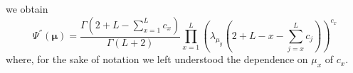 \documentclass[10pt]{article}
\numberwithin{equation}{section}
\numberwithin{equation}{subsection}
\begin{document}
we obtain 
\begin{equation}\label{coefficients-psiSec}
	\Psi^{''}(\bm{\mu})=\frac{\Gamma(2+L-\sum_{x=1}^{L}c_{x})}{\Gamma(L+2)}\prod_{x=1}^{L}\left(\lambda_{\mu_{y}}\left(2+L-x-\sum_{j=x}^{L}c_{j}\right)\right)^{c_{x}}
\end{equation}
where, for the sake of notation we left understood the dependence on $\mu_{x}$ of $c_{x}$.
\begin{comment}
We introduce the following notation
\begin{equation}\label{notation1}
    e_{ab}=e_{a}^{b}=\left(\delta_{ac}\delta_{bd}\right)_{c,d\in\{1,\ldots,N\}}\qquad \forall a,b\in \{1,\ldots,N\}
\end{equation}
and 
\begin{equation}\label{notation2}
    e_{ab}\otimes e_{cd}=e_{a,c}^{b,d}=\left(\delta_{(a,b),(e,f)}\delta_{(c,d),(g,h)}\right)_{e,f,g,h\in \{1,\ldots,N\}}\qquad \forall a,b,c,d\in \{1,\ldots,N\}
    \end{equation}
    that can be generalized for $e_{\tau_{1},\ldots,\tau_{L}}^{q_{1},\ldots,q_{L}}$ with $\tau_{1},\ldots,\tau_{L},q_{1},\ldots,q_{L}\in \{1,\ldots,N\}$. With this notation we have that
    
    \begin{equation}\label{InverseS2}
    	\begin{split}
    		\left(\mathcal{S}_{2}^{-1}\right)^{\otimes L}&=\sum_{\tau_{1}=1}^{N}\ldots\sum_{\tau_{L}=1}^{N}\left\{e_{\tau_{1},\ldots,\tau_{L}}^{\tau_{1},\ldots,\tau_{L}}+\sum_{q_{1}=1}^{L}(1-\delta_{\tau_{q_{1}},N})e_{\tau_{1},\ldots,\tau_{L}}^{\varphi_{1}^{1},\ldots,\varphi_{L}^{1}}\beta_{\tau_{q_{1}}}\right. 
    		\\&+\left. \sum_{q_{1},q_{2}=1\,:\,q_{1}\neq q_{2}}^{L}(1-\delta_{\tau_{q_{1}},N})(1-\delta_{\tau_{q_{2}},N})e^{\varphi_{1}^{2},\ldots,\varphi_{L}^{2}}_{\tau_{1},\ldots,\tau_{L}}\beta_{\tau_{q_{1}}}\beta_{\tau_{q_{2}}}\right.
    		\\&+\left.
    		\ldots+	\sum_{q_{1},\ldots,q_{L-1}=1\,:\,q_{i}\neq q_{j}\,\text{if}\,i\neq j}^{L}\left(\prod_{t=1}^{L-1}(1-\delta_{\tau_{q_{t}},N})\right)e_{\tau_{1},\ldots,\tau_{L}}^{\varphi_{1}^{L-1},\ldots,\varphi_{L}^{L-1}}
    		\right. \\&+ \left. 
    		\sum_{q_{1},\ldots,q_{L}=1\,:\,q_{i}\neq q_{j}\,\text{if}\,i\neq j}^{L}\left(\prod_{x=1}^{L}(1-\delta_{\tau_{x},N})\right)\beta_{\tau_{x}}e_{\tau_{1},\ldots,\tau_{L}}^{\varphi_{1}^{L},\ldots,\varphi_{L}^{L}} \right\}
    	\end{split}
    \end{equation}
\end{comment}
\end{document}
